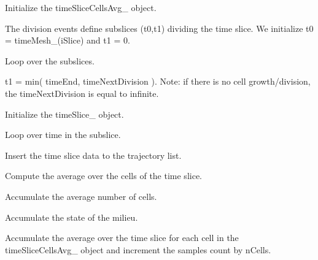 \begin{DoxyItemize}
\item \-Initialize the time\-Slice\-Cells\-Avg\-\_\- object.
\end{DoxyItemize}

\-The division events define subslices (t0,t1) dividing the time slice. \-We initialize t0 = time\-Mesh\-\_\-(i\-Slice) and t1 = 0.


\begin{DoxyItemize}
\item \-Loop over the subslices.
\end{DoxyItemize}


\begin{DoxyItemize}
\item t1 = min( time\-End, time\-Next\-Division ). \-Note\-: if there is no cell growth/division, the time\-Next\-Division is equal to infinite.
\end{DoxyItemize}


\begin{DoxyItemize}
\item \-Initialize the time\-Slice\-\_\- object.
\end{DoxyItemize}


\begin{DoxyItemize}
\item \-Loop over time in the subslice.
\end{DoxyItemize}


\begin{DoxyItemize}
\item \-Insert the time slice data to the trajectory list.
\end{DoxyItemize}


\begin{DoxyItemize}
\item \-Compute the average over the cells of the time slice.
\end{DoxyItemize}


\begin{DoxyItemize}
\item \-Accumulate the average number of cells.
\end{DoxyItemize}


\begin{DoxyItemize}
\item \-Accumulate the state of the milieu.
\end{DoxyItemize}


\begin{DoxyItemize}
\item \-Accumulate the average over the time slice for each cell in the time\-Slice\-Cells\-Avg\-\_\- object and increment the samples count by n\-Cells.
\end{DoxyItemize}


